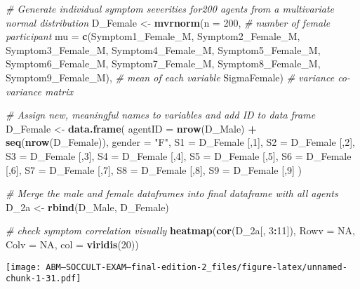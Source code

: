 \documentclass[]{article}
\newenvironment{Shaded}{\begin{snugshade}}{\end{snugshade}}
\newcommand{\KeywordTok}[1]{\textcolor[rgb]{0.13,0.29,0.53}{\textbf{#1}}}
\newcommand{\DataTypeTok}[1]{\textcolor[rgb]{0.13,0.29,0.53}{#1}}
\newcommand{\DecValTok}[1]{\textcolor[rgb]{0.00,0.00,0.81}{#1}}
\newcommand{\StringTok}[1]{\textcolor[rgb]{0.31,0.60,0.02}{#1}}
\newcommand{\CommentTok}[1]{\textcolor[rgb]{0.56,0.35,0.01}{\textit{#1}}}
\newcommand{\OtherTok}[1]{\textcolor[rgb]{0.56,0.35,0.01}{#1}}
\newcommand{\OperatorTok}[1]{\textcolor[rgb]{0.81,0.36,0.00}{\textbf{#1}}}
\newcommand{\NormalTok}[1]{#1}
\begin{document}
\begin{Shaded}
\begin{Highlighting}[]
\CommentTok{# Generate individual symptom severities for200 agents from a multivariate normal distribution}
\NormalTok{D_Female <-}\StringTok{ }\KeywordTok{mvrnorm}\NormalTok{(}\DataTypeTok{n =} \DecValTok{200}\NormalTok{, }\CommentTok{# number of female participant}
                    \DataTypeTok{mu =} \KeywordTok{c}\NormalTok{(Symptom1_Female_M, Symptom2_Female_M, Symptom3_Female_M, Symptom4_Female_M, Symptom5_Female_M, Symptom6_Female_M, Symptom7_Female_M, Symptom8_Female_M, Symptom9_Female_M), }\CommentTok{# mean of each variable}
\NormalTok{                    SigmaFemale) }\CommentTok{# variance co-variance matrix}

\CommentTok{# Assign new, meaningful names to variables and add ID to data frame}
\NormalTok{D_Female <-}\StringTok{ }\KeywordTok{data.frame}\NormalTok{(}
  \DataTypeTok{agentID =} \KeywordTok{nrow}\NormalTok{(D_Male) }\OperatorTok{+}\StringTok{ }\KeywordTok{seq}\NormalTok{(}\KeywordTok{nrow}\NormalTok{(D_Female)),}
  \DataTypeTok{gender =} \StringTok{"F"}\NormalTok{,}
  \DataTypeTok{S1 =}\NormalTok{ D_Female [,}\DecValTok{1}\NormalTok{],}
  \DataTypeTok{S2 =}\NormalTok{  D_Female [,}\DecValTok{2}\NormalTok{],}
  \DataTypeTok{S3 =}\NormalTok{  D_Female [,}\DecValTok{3}\NormalTok{],}
  \DataTypeTok{S4 =}\NormalTok{ D_Female [,}\DecValTok{4}\NormalTok{],}
  \DataTypeTok{S5 =}\NormalTok{ D_Female [,}\DecValTok{5}\NormalTok{],}
  \DataTypeTok{S6 =}\NormalTok{  D_Female [,}\DecValTok{6}\NormalTok{],}
  \DataTypeTok{S7 =}\NormalTok{  D_Female [,}\DecValTok{7}\NormalTok{],}
  \DataTypeTok{S8 =}\NormalTok{ D_Female [,}\DecValTok{8}\NormalTok{],}
  \DataTypeTok{S9 =}\NormalTok{ D_Female [,}\DecValTok{9}\NormalTok{]}
\NormalTok{)}


\CommentTok{# Merge the male and female dataframes into final dataframe with all agents}
\NormalTok{D_2a <-}\StringTok{ }\KeywordTok{rbind}\NormalTok{(D_Male, D_Female)}

\CommentTok{# check symptom correlation visually}
\KeywordTok{heatmap}\NormalTok{(}\KeywordTok{cor}\NormalTok{(D_2a[, }\DecValTok{3}\OperatorTok{:}\DecValTok{11}\NormalTok{]), }\DataTypeTok{Rowv =} \OtherTok{NA}\NormalTok{, }\DataTypeTok{Colv =} \OtherTok{NA}\NormalTok{, }\DataTypeTok{col =} \KeywordTok{viridis}\NormalTok{(}\DecValTok{20}\NormalTok{))}
\end{Highlighting}
\end{Shaded}

\texttt{[image: ABM---SOCCULT-EXAM---final-edition-2\_files/figure-latex/unnamed-chunk-1-31.pdf]}
\end{document}
